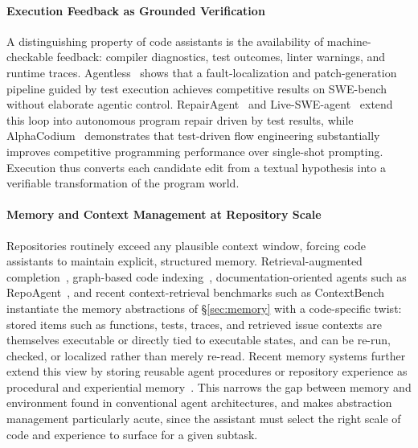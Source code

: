 \paragraph{Execution Feedback as Grounded Verification}
A distinguishing property of code assistants is the availability of machine-checkable feedback: compiler diagnostics, test outcomes, linter warnings, and runtime traces.
Agentless~\cite{xia2024agentless} shows that a fault-localization and patch-generation pipeline guided by test execution achieves competitive results on SWE-bench~\cite{jimenez2024swebench} without elaborate agentic control.
RepairAgent~\cite{bouzenia2025repairagent} and Live-SWE-agent~\cite{xia2025live} extend this loop into autonomous program repair driven by test results, while AlphaCodium~\cite{ridnik2024alphacodium} demonstrates that test-driven flow engineering substantially improves competitive programming performance over single-shot prompting.
Execution thus converts each candidate edit from a textual hypothesis into a verifiable transformation of the program world.

\paragraph{Memory and Context Management at Repository Scale}
Repositories routinely exceed any plausible context window, forcing code assistants to maintain explicit, structured memory.
Retrieval-augmented completion~\cite{zhang2023repocoder}, graph-based code indexing~\cite{liu2024codexgraphbridginglargelanguage}, documentation-oriented agents such as RepoAgent~\cite{luo-etal-2024-repoagent}, and recent context-retrieval benchmarks such as ContextBench~\cite{li2026contextbench} instantiate the memory abstractions of \S\ref{sec:memory} with a code-specific twist: stored items such as functions, tests, traces, and retrieved issue contexts are themselves executable or directly tied to executable states, and can be re-run, checked, or localized rather than merely re-read.
Recent memory systems further extend this view by storing reusable agent procedures or repository experience as procedural and experiential memory~\cite{gaurav2025codemem,wang2026memgovern}.
This narrows the gap between memory and environment found in conventional agent architectures, and makes abstraction management particularly acute, since the assistant must select the right scale of code and experience to surface for a given subtask.

